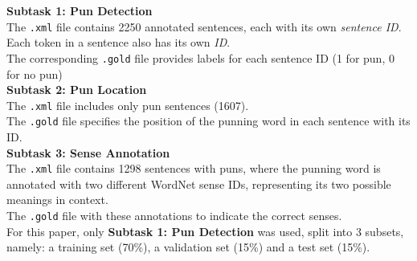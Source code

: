 \documentclass[10pt]{article}
\begin{document}
\textbf{Subtask 1: Pun Detection} \\[6pt]
The \texttt{.xml} file contains 2250 annotated sentences, each with its own \textit{sentence ID}.\\[6pt]  
Each token in a sentence also has its own \textit{ID}.\\[6pt]
The corresponding \texttt{.gold} file provides labels for each sentence ID (1 for pun, 0 for no pun)\\[6pt]

\textbf{{Subtask 2: Pun Location}} \\[6pt]
The \texttt{.xml} file includes only pun sentences (1607).\\[6pt]
The \texttt{.gold} file specifies the position of the punning word in each sentence with its ID.\\[6pt]

\textbf{{Subtask 3: Sense Annotation}} \\[6pt]
The \texttt{.xml} file contains 1298 sentences with puns, where the punning word is annotated with two different WordNet sense IDs, representing its two possible meanings in context.\\[6pt]
The \texttt{.gold} file with these annotations to indicate the correct senses.\\[20pt]
For this paper, only \textbf{Subtask 1: Pun Detection} was used, split into 3 subsets, namely: a training set (70\%), a validation set (15\%) and a test set (15\%). 
\end{document}
